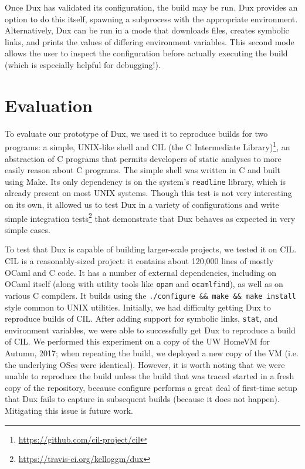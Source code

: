 \documentclass[10pt,conference]{IEEEtran}
\begin{document}
Once Dux has validated its configuration, the build may be run. Dux provides an option to do this itself, spawning
a subprocess with the appropriate environment. Alternatively, Dux can be run in a mode that downloads files,
creates symbolic links, and prints the values of differing environment variables. This second mode allows the user
to inspect the configuration before actually executing the build (which is especially helpful for debugging!).

\section{Evaluation}

To evaluate our prototype of Dux, we used it to reproduce builds for two programs: a simple, UNIX-like shell and
CIL (the C Intermediate Library)\footnote{\url{https://github.com/cil-project/cil}}, an abstraction of C programs
that permits developers of static analyses to more easily reason about C programs. The simple shell was written in
C and built using Make. Its only dependency is on the system's \texttt{readline} library, which is already
present on most UNIX systems. Though this test is not very interesting on its own, it allowed us to test Dux in
a variety of configurations and write simple integration tests\footnote{\url{https://travis-ci.org/kelloggm/dux}}
that demonstrate that Dux behaves as expected in very simple cases.

To test that Dux is capable of building larger-scale projects, we tested it on CIL. CIL is a reasonably-sized
project: it contains about 120,000 lines of mostly OCaml and C code. It has a number of external dependencies,
including on OCaml itself (along with utility tools like \texttt{opam} and \texttt{ocamlfind}), as well as on
various C compilers. It builds using the \texttt{./configure \&\& make \&\& make install} style common to UNIX
utilities. Initially, we had difficulty getting Dux to reproduce builds of CIL. After adding support for symbolic
links, \texttt{stat}, and environment variables, we were able to successfully get Dux to reproduce a build of CIL.
We performed this experiment on a copy of the UW HomeVM for Autumn, 2017; when repeating the build, we deployed
a new copy of the VM (i.e. the underlying OSes were identical). However, it is worth noting that we were unable
to reproduce the build unless the build that was traced started in a fresh copy of the repository, because
configure performs a great deal of first-time setup that Dux fails to capture in subsequent builds (because it
does not happen). Mitigating this issue is future work.
\end{document}
